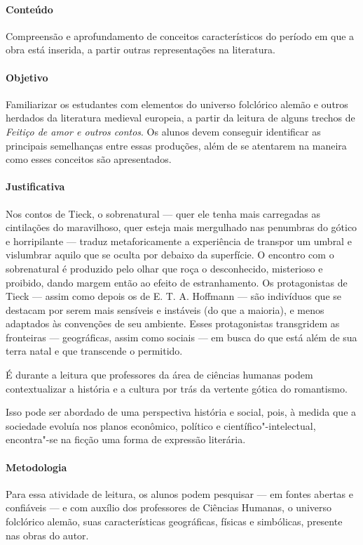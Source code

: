 \documentclass[12pt]{extarticle}
\begin{document}
\paragraph{Conteúdo} Compreensão e aprofundamento de conceitos característicos do período 
em que a obra está inserida, a partir outras representações na literatura.

\paragraph{Objetivo} Familiarizar os estudantes com elementos do universo folclórico alemão e outros herdados da 
literatura medieval europeia, a partir da leitura de alguns trechos de \emph{Feitiço de amor e outros contos}.
Os alunos devem conseguir identificar as principais semelhanças entre essas produções, além de se atentarem na 
maneira como esses conceitos são apresentados.

\paragraph{Justificativa} Nos contos de Tieck, o sobrenatural --- quer ele tenha mais carregadas
as cintilações do maravilhoso, quer esteja mais mergulhado nas penumbras
do gótico e horripilante --- traduz metaforicamente a experiência de
transpor um umbral e vislumbrar aquilo que se oculta por debaixo da
superfície. O encontro com o sobrenatural é produzido pelo olhar que
roça o desconhecido, misterioso e proibido, dando margem então ao efeito
de estranhamento. Os protagonistas de Tieck --- assim como depois os de
E. T. A. Hoffmann --- são indivíduos que se destacam por serem mais
sensíveis e instáveis (do que a maioria), e menos adaptados às
convenções de seu ambiente. Esses protagonistas transgridem as
fronteiras --- geográficas, assim como sociais --- em busca do que está
além de sua terra natal e que transcende o permitido.

É durante a leitura que professores da área de ciências humanas
podem contextualizar a história e a cultura por trás da vertente gótica
do romantismo.

Isso pode ser abordado de uma perspectiva história e social, pois, à
medida que a sociedade evoluía nos planos econômico, político e
científico"-intelectual, encontra"-se na ficção uma forma de expressão 
literária.

\paragraph{Metodologia}
Para essa atividade de leitura, os alunos podem pesquisar --- em fontes abertas 
e confiáveis --- e com auxílio dos professores de Ciências Humanas, o universo 
folclórico alemão, suas características geográficas, físicas e simbólicas, presente nas obras do autor.
\end{document}

